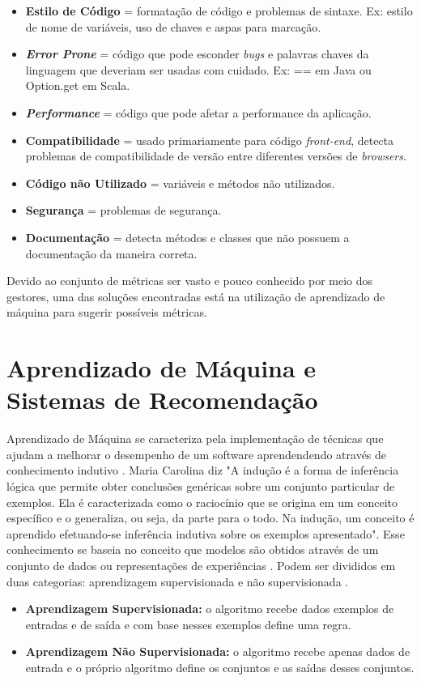 \begin{itemize}
\item\textbf{Estilo de Código} =  formatação de código e problemas de sintaxe. Ex: estilo de nome de variáveis, uso de chaves e aspas para marcação.
\item\textbf{\textit{Error Prone}} = código que pode esconder \textit{bugs} e palavras chaves da linguagem que deveriam ser usadas com cuidado. Ex: == em Java ou Option.get em Scala.
\item\textbf{\textit{Performance}} = código que pode afetar a performance da aplicação.
\item\textbf{Compatibilidade} = usado primariamente para código \textit{front-end}, detecta problemas de compatibilidade de versão entre diferentes versões de \textit{browsers}.
\item\textbf{Código não Utilizado} = variáveis e métodos não utilizados.
\item\textbf{Segurança} = problemas de segurança.
\item\textbf{Documentação} = detecta métodos e classes que não possuem a documentação da maneira correta.

\end{itemize}

Devido ao conjunto de métricas ser vasto e pouco conhecido por meio dos gestores, uma das soluções encontradas está na utilização de aprendizado de máquina para sugerir possíveis métricas.


\section{Aprendizado de Máquina e Sistemas de Recomendação}

Aprendizado de Máquina se caracteriza pela implementação de técnicas que ajudam a melhorar o desempenho de um software aprendendendo através de conhecimento indutivo \cite{mitchell1997mcgraw}. Maria Carolina \cite{monard2003conceitos} diz "A indução é a forma de inferência lógica que permite obter conclusões genéricas sobre um conjunto particular de exemplos. Ela é caracterizada como o raciocínio que se origina em um conceito específico e o generaliza, ou seja, da parte para o todo. Na indução, um conceito é aprendido efetuando-se inferência indutiva sobre os exemplos apresentado". Esse conhecimento se baseia no conceito que modelos são obtidos através de um conjunto de dados ou representações de experiências \cite{peres2012tutorial}. Podem ser divididos em duas categorias: aprendizagem supervisionada e não supervisionada \cite{russell2009artificial}.
\begin{itemize}
\item\textbf{Aprendizagem Supervisionada:} o algoritmo recebe dados exemplos de entradas e de saída e com base nesses exemplos define uma regra.
\item\textbf{Aprendizagem Não Supervisionada: } o algoritmo recebe apenas dados de entrada e o próprio algoritmo define os conjuntos e as saídas desses conjuntos.
\end{itemize}

